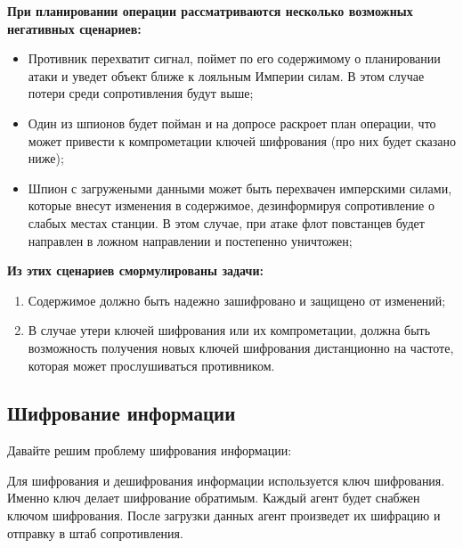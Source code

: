 \documentclass[12pt]{article}
\begin{document}
   \textbf{ При планировании операции рассматриваются несколько возможных негативных сценариев:}
    
    \begin{itemize}
    	
    	\item Противник перехватит сигнал, поймет по его содержимому о планировании атаки и уведет объект ближе к лояльным Империи силам. В этом случае потери среди сопротивления будут выше;
    	
    	
    	\item Один из шпионов будет пойман и на допросе раскроет план операции, что может привести к компрометации ключей шифрования (про них будет сказано ниже);
    	
    	\item Шпион с загружеными данными может быть перехвачен имперскими силами, которые внесут изменения в содержимое, дезинформируя сопротивление о слабых местах станции. В этом случае, при атаке флот повстанцев будет направлен в ложном направлении и постепенно уничтожен;
    	
    \end{itemize}

	\textbf{Из этих сценариев смормулированы задачи:}
	
	\begin{enumerate}
		
		\item Содержимое должно быть надежно зашифровано и защищено от изменений;
		
		\item В случае утери ключей шифрования или их компрометации, должна быть возможность получения новых ключей шифрования дистанционно на частоте, которая может прослушиваться противником.
		
	\end{enumerate}

\subsection{Шифрование информации}
		Давайте решим проблему шифрования информации:
		
		\vspace{0.5cm}
		
		Для шифрования и дешифрования информации используется ключ шифрования. Именно ключ делает шифрование обратимым. Каждый агент будет снабжен ключом шифрования. После загрузки данных агент произведет их шифрацию и отправку в штаб сопротивления.
		
\end{document}
